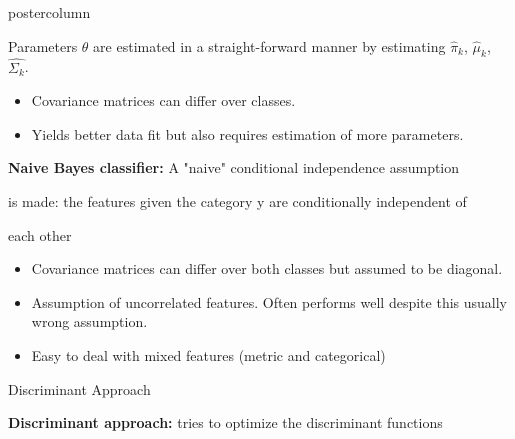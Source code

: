 \documentclass{beamer}
\begin{document}
\begin{frame}[fragile]{}
\begin{columns}
\begin{column}{.31\textwidth}
\begin{beamercolorbox}[center]{postercolumn}
\begin{minipage}{.98\textwidth}
{\begin{myblock}{}
  \hspace*{1ex}Parameters $\theta$ are estimated in a straight-forward manner by estimating \hspace*{1ex}$\hat{\pi}_k$, $\hat{\mu}_k$, $\hat{\Sigma_k}$.
  
  \begin{itemize}[$\bullet$]     
  \setlength{\itemindent}{+.3in}
      \item Covariance matrices can differ over classes.
      \item Yields better data fit but also requires estimation of more parameters.
  \end{itemize}
  
  \vspace*{1ex}
  
  \begin{codebox}
  \textbf{Naive Bayes classifier: }A "naive" conditional independence assumption
  \end{codebox}

  \begin{codebox}
  is made: the features given the category y are conditionally independent of
  \end{codebox}
  
  \begin{codebox}
  each other
  \end{codebox}
  
  \begin{itemize}[$\bullet$]
    \setlength{\itemindent}{+.3in}
      \item Covariance matrices can differ over both classes but assumed to be diagonal.
      \item Assumption of uncorrelated features. Often performs well despite this usually wrong assumption.
      \item Easy to deal with mixed features (metric and categorical)
  \end{itemize}
  
  \end{myblock}
  
  \begin{myblock}{Discriminant  Approach}
  \begin{codebox}
  \textbf{Discriminant approach: }tries to optimize the discriminant functions
  \end{codebox}
  \end{myblock}
  }
  \end{minipage}
		\end{beamercolorbox}
	\end{column}
	

\end{columns}
\end{frame}
\end{document}
